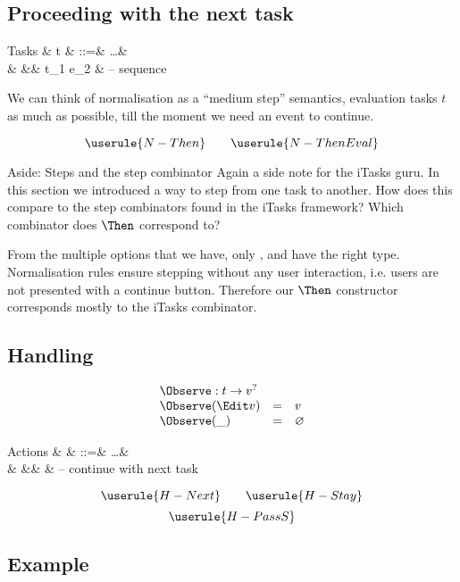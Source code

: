 \subsection{Proceeding with the next task}

\begin{grammar}
  Tasks
    & t & ::=& \ldots        & \\
    &   &\mid& t_1 \Then e_2 & – sequence \\
\end{grammar}

We can think of normalisation as a \enquote{medium step} semantics,
evaluation tasks $t$ as much as possible,
till the moment we need an event to continue.

\begin{equation*}
  \userule{N-Then} \qquad \userule{N-ThenEval}
\end{equation*}

\begin{margintext}{Aside: Steps and the step combinator}
Again a side note for the iTasks guru.
In this section we introduced a way to step from one task to another.
How does this compare to the step combinators found in the iTasks framework?
Which combinator does $\Then$ correspond to?

From the multiple options that we have,
only \type{(>>=)}, \type{(>>-)} and \type{(>>\texttilde)} have the right type.
Normalisation rules  ensure stepping without any user interaction,
i.e. users are not presented with a continue button.
Therefore our $\Then$ constructor corresponds mostly to the iTasks \type{(>>-)} combinator.
\end{margintext}


\subsection{Handling}

\begin{equation*}
  \begin{array}{lcl}
    \multicolumn{3}{l}{\Observe : t \to v^?} \\
    \Observe(\Edit v) &=& v \\
    \Observe(\_)      &=& \nothing
  \end{array}
\end{equation*}

\begin{grammar}
  Actions
    & \alpha & ::=& \ldots & \\
    &        &\mid& \Next  & – continue with next task \\
\end{grammar}

\begin{equation*}
  \userule{H-Next} \qquad \userule{H-Stay}
\end{equation*}
\begin{equation*}
  \userule{H-PassS}
\end{equation*}

\subsection{Example}
